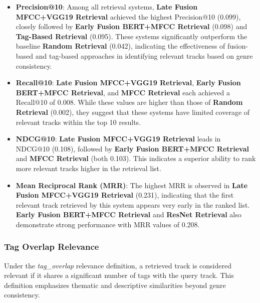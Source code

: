 \documentclass[sigconf]{acmart}
\begin{document}
\begin{itemize}
    \item \textbf{Precision@10}: Among all retrieval systems, \textbf{Late Fusion MFCC+VGG19 Retrieval} achieved the highest Precision@10 (0.099), closely followed by \textbf{Early Fusion BERT+MFCC Retrieval} (0.098) and \textbf{Tag-Based Retrieval} (0.095). These systems significantly outperform the baseline \textbf{Random Retrieval} (0.042), indicating the effectiveness of fusion-based and tag-based approaches in identifying relevant tracks based on genre consistency.
    
    \item \textbf{Recall@10}: \textbf{Late Fusion MFCC+VGG19 Retrieval}, \textbf{Early Fusion BERT+MFCC Retrieval}, and \textbf{MFCC Retrieval} each achieved a Recall@10 of 0.008. While these values are higher than those of \textbf{Random Retrieval} (0.002), they suggest that these systems have limited coverage of relevant tracks within the top 10 results.
    
    \item \textbf{NDCG@10}: \textbf{Late Fusion MFCC+VGG19 Retrieval} leads in NDCG@10 (0.108), followed by \textbf{Early Fusion BERT+MFCC Retrieval} and \textbf{MFCC Retrieval} (both 0.103). This indicates a superior ability to rank more relevant tracks higher in the retrieval list.
    
    \item \textbf{Mean Reciprocal Rank (MRR)}: The highest MRR is observed in \textbf{Late Fusion MFCC+VGG19 Retrieval} (0.231), indicating that the first relevant track retrieved by this system appears very early in the ranked list. \textbf{Early Fusion BERT+MFCC Retrieval} and \textbf{ResNet Retrieval} also demonstrate strong performance with MRR values of 0.208.
\end{itemize}


\subsubsection{Tag Overlap Relevance}
\label{subsubsec:tag_overlap_relevance}

Under the \textit{tag\_overlap} relevance definition, a retrieved track is considered relevant if it shares a significant number of tags with the query track. This definition emphasizes thematic and descriptive similarities beyond genre consistency.
\end{document}
